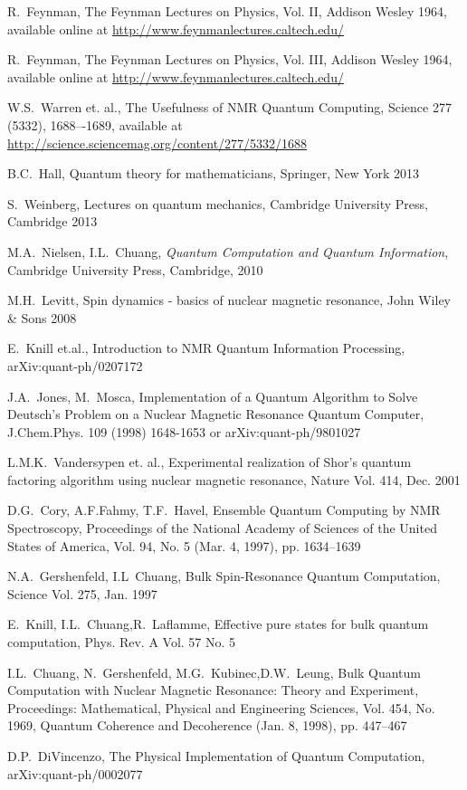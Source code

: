 \documentclass[a4paper, draft]{article}
\theoremstyle{own}
\theoremstyle{remark}
\begin{document}
\begin{thebibliography}{9}


R.~Feynman,
The Feynman Lectures on Physics, Vol. II, Addison Wesley 1964, available online at \url{http://www.feynmanlectures.caltech.edu/}


R.~Feynman,
The Feynman Lectures on Physics, Vol. III, Addison Wesley 1964, available online at \url{http://www.feynmanlectures.caltech.edu/}


W.S.~Warren et. al., 
The Usefulness of NMR Quantum Computing, Science 277 (5332), 1688–-1689, available at \url{http://science.sciencemag.org/content/277/5332/1688}

B.C.~Hall, Quantum theory for mathematicians, Springer, New York 2013

S.~Weinberg, Lectures on quantum mechanics, Cambridge University Press, Cambridge 2013

M.A.~Nielsen, I.L.~Chuang, \emph{Quantum Computation and Quantum Information},
Cambridge University Press, Cambridge, 2010


M.H.~Levitt, Spin dynamics - basics of nuclear magnetic resonance, John Wiley \& Sons 2008

E.~Knill et.al., 
Introduction to NMR Quantum Information Processing,
arXiv:quant-ph/0207172

J.A.~Jones, M.~Mosca,
Implementation of a Quantum Algorithm to Solve Deutsch's Problem on a Nuclear Magnetic
Resonance Quantum Computer, J.Chem.Phys. 109 (1998) 1648-1653 or arXiv:quant-ph/9801027

L.M.K.~Vandersypen et. al.,
Experimental realization of Shor's quantum factoring algorithm using nuclear magnetic resonance, Nature Vol. 414, Dec. 2001

D.G.~Cory, A.F.Fahmy, T.F.~Havel,
Ensemble Quantum Computing by NMR Spectroscopy,
Proceedings of the National Academy of Sciences of the United States of America,
Vol. 94, No. 5 (Mar. 4, 1997), pp. 1634--1639

N.A.~Gershenfeld, I.L~Chuang,
Bulk Spin-Resonance Quantum Computation, Science Vol. 275, Jan. 1997

E.~Knill, I.L.~Chuang,R.~Laflamme,
Effective pure states for bulk quantum computation, Phys. Rev. A Vol. 57 No. 5

I.L.~Chuang, N.~Gershenfeld, M.G.~Kubinec,D.W.~Leung,
Bulk Quantum Computation with Nuclear Magnetic Resonance: Theory and Experiment,
Proceedings: Mathematical, Physical and Engineering Sciences, Vol. 454, No. 1969, Quantum Coherence and Decoherence (Jan. 8, 1998), pp. 447--467

D.P.~DiVincenzo, The Physical Implementation of Quantum Computation, arXiv:quant-ph/0002077

\end{thebibliography}
\end{document}
